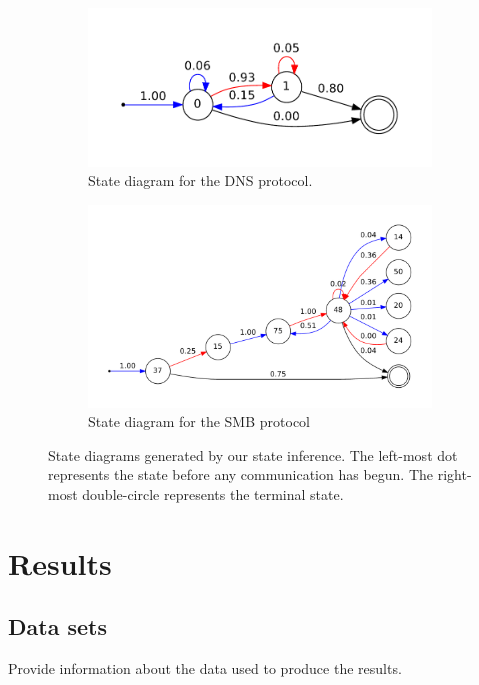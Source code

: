 \documentclass[a4paper]{report}
\begin{document}
\begin{figure}[h]
    \centering
    \begin{subfigure}[b]{0.48\textwidth}
        \includegraphics[width=\textwidth]{dnsstate}
        \caption{State diagram for the DNS protocol.}
        \label{fig:dnsstate}
    \end{subfigure}
    \quad
    \begin{subfigure}[b]{0.48\textwidth}
        \includegraphics[width=\textwidth]{smbstate}
        \caption{State diagram for the SMB protocol}
        \label{fig:smbstate}
    \end{subfigure}
    \caption{State diagrams generated by our state inference. The left-most
        dot represents the state before any communication has begun. The
        right-most double-circle represents the terminal state.}
    \label{fig:states}
\end{figure}

\chapter{Results}

\section{Data sets}
Provide information about the data used to produce the results.
\end{document}
